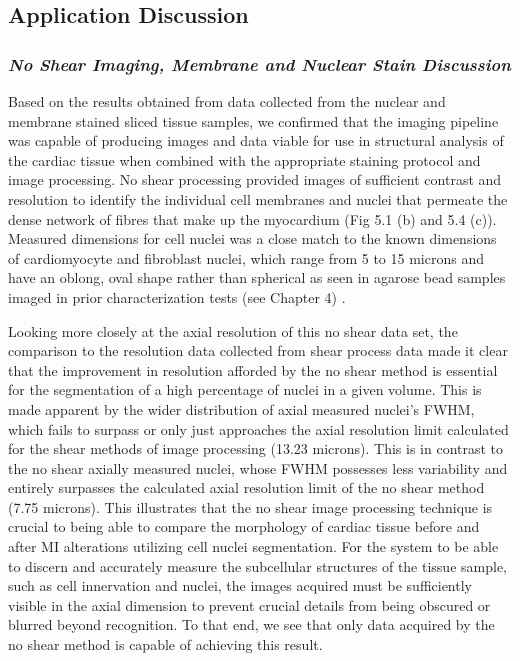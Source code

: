 \subsection{Application Discussion}
\subsubsection{\textit{No Shear Imaging, Membrane and Nuclear Stain Discussion}}
Based on the results obtained from data collected from the nuclear and membrane stained sliced tissue samples, we confirmed that the imaging pipeline was capable of producing images and data viable for use in structural analysis of the cardiac tissue when combined with the appropriate staining protocol and image processing. No shear processing provided images of sufficient contrast and resolution to identify the individual cell membranes and nuclei that permeate the dense network of fibres that make up the myocardium (Fig 5.1 (b) and 5.4 (c)). Measured dimensions for cell nuclei was a close match to the known dimensions of cardiomyocyte and fibroblast nuclei, which range from 5 to 15 microns and have an oblong, oval shape rather than spherical as seen in agarose bead samples imaged in prior characterization tests (see Chapter 4) \cite{woodcock_cardiomyocytes_2005}. 

Looking more closely at the axial resolution of this no shear data set, the comparison to the resolution data collected from shear process data made it clear that the improvement in resolution afforded by the no shear method is essential for the segmentation of a high percentage of nuclei in a given volume. This is made apparent by the wider distribution of axial measured nuclei's FWHM, which fails to surpass or only just approaches the axial resolution limit calculated for the shear methods of image processing (13.23 microns). This is in contrast to the no shear axially measured nuclei, whose FWHM possesses less variability and entirely surpasses the calculated axial resolution limit of the no shear method (7.75 microns). This illustrates that the no shear image processing technique is crucial to being able to compare the morphology of cardiac tissue before and after MI alterations utilizing cell nuclei segmentation. For the system to be able to discern and accurately measure the subcellular structures of the tissue sample, such as cell innervation and nuclei, the images acquired must be sufficiently visible in the axial dimension to prevent crucial details from being obscured or blurred beyond recognition. To that end, we see that only data acquired by the no shear method is capable of achieving this result.

